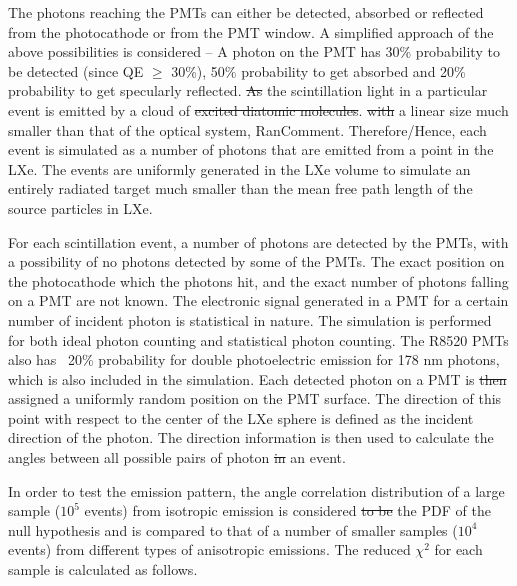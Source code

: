 The photons reaching the PMTs can either be detected, absorbed or reflected from the photocathode 
or from the PMT window. A simplified approach of the above possibilities is considered -- 
A photon  on the PMT has  30\% probability to be detected (since QE $\geq$ 30\%), 50\% probability to get 
absorbed and 20\% probability to get specularly reflected. \sout{As} the scintillation light in a particular 
event is emitted by a cloud of \sout{excited diatomic molecules}.  \sout{with} a linear size much smaller than that 
of the optical system, RanComment{. Therefore/Hence,} each event is simulated as a number of photons that are emitted from a point 
in the LXe. The events are uniformly generated in the LXe volume to simulate an entirely radiated 
target much smaller than the mean free path length of the source particles in LXe.

For each scintillation event, a number of photons are detected by the PMTs, with a possibility of 
no photons detected by some of the PMTs. The exact position on the photocathode which the photons hit, 
and the exact number of photons falling on a PMT are not known. The electronic signal generated in a PMT 
for a certain number of incident photon is statistical in nature. The simulation is performed for both 
ideal photon counting and statistical photon counting. The R8520 PMTs also has  ~20\% probability 
for double photoelectric emission for 178 nm photons, which is also included in the simulation.
Each detected photon 
on a PMT is \sout{then} assigned a uniformly random position on the PMT surface. The direction of this point with respect 
to the center of the LXe sphere is defined as the incident direction of the photon. The direction information 
is then used to calculate the angles between all possible pairs of photon \sout{in} an event.

In order to test the emission pattern, the angle correlation distribution of a large sample ($10^5$ events) 
from isotropic emission is considered \sout{to be} the PDF of the null hypothesis and is compared 
to that of a number of smaller samples ($10^4$ events) from different types of anisotropic emissions. 
The reduced $\chi^2$ for each sample is calculated as follows.

